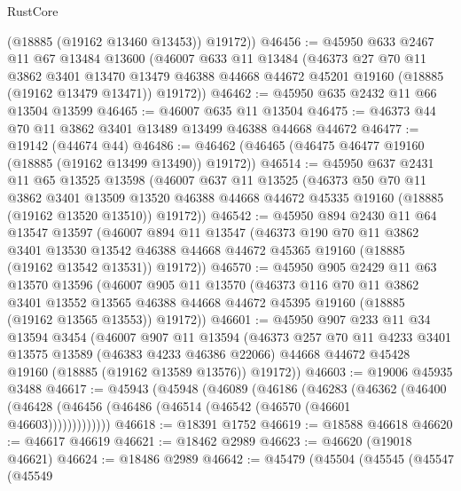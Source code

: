 \begin{lexlean}{RustCore}
\begin{coremodule}
        (@18885 (@19162 @13460 @13453))
        @19172))
@46456 := @45950
    @633
    @2467
    @11
    @67
    @13484
    @13600
    (@46007
      @633
      @11
      @13484
      (@46373
        @27
        @70
        @11
        @3862
        @3401
        @13470
        @13479
        @46388
        @44668
        @44672
        @45201
        @19160
        (@18885 (@19162 @13479 @13471))
        @19172))
@46462 := @45950 @635 @2432 @11 @66 @13504 @13599
@46465 := @46007 @635 @11 @13504
@46475 := @46373 @44 @70 @11 @3862 @3401 @13489 @13499 @46388 @44668 @44672
@46477 := @19142 (@44674 @44)
@46486 := @46462 (@46465 (@46475 @46477 @19160 (@18885 (@19162 @13499 @13490)) @19172))
@46514 := @45950
    @637
    @2431
    @11
    @65
    @13525
    @13598
    (@46007
      @637
      @11
      @13525
      (@46373
        @50
        @70
        @11
        @3862
        @3401
        @13509
        @13520
        @46388
        @44668
        @44672
        @45335
        @19160
        (@18885 (@19162 @13520 @13510))
        @19172))
@46542 := @45950
    @894
    @2430
    @11
    @64
    @13547
    @13597
    (@46007
      @894
      @11
      @13547
      (@46373
        @190
        @70
        @11
        @3862
        @3401
        @13530
        @13542
        @46388
        @44668
        @44672
        @45365
        @19160
        (@18885 (@19162 @13542 @13531))
        @19172))
@46570 := @45950
    @905
    @2429
    @11
    @63
    @13570
    @13596
    (@46007
      @905
      @11
      @13570
      (@46373
        @116
        @70
        @11
        @3862
        @3401
        @13552
        @13565
        @46388
        @44668
        @44672
        @45395
        @19160
        (@18885 (@19162 @13565 @13553))
        @19172))
@46601 := @45950
    @907
    @233
    @11
    @34
    @13594
    @3454
    (@46007
      @907
      @11
      @13594
      (@46373
        @257
        @70
        @11
        @4233
        @3401
        @13575
        @13589
        (@46383 @4233 @46386 @22066)
        @44668
        @44672
        @45428
        @19160
        (@18885 (@19162 @13589 @13576))
        @19172))
@46603 := @19006 @45935 @3488
@46617 := @45943
    (@45948
      (@46089
        (@46186
          (@46283
            (@46362
              (@46400 (@46428 (@46456 (@46486 (@46514 (@46542 (@46570 (@46601 @46603)))))))))))))
@46618 := @18391 @1752
@46619 := @18588 @46618
@46620 := @46617 @46619
@46621 := @18462 @2989
@46623 := @46620 (@19018 @46621)
@46624 := @18486 @2989
@46642 := @45479
    (@45504
      (@45545
        (@45547
          (@45549

\end{coremodule}
\end{lexlean}
